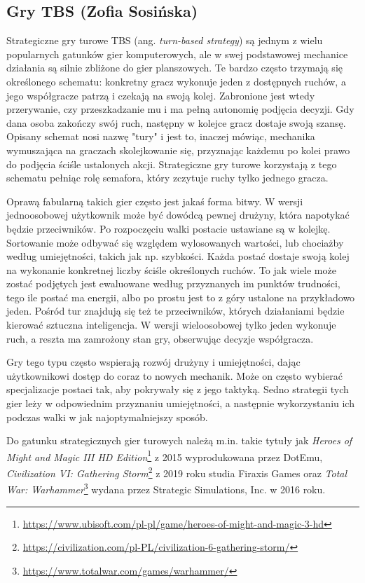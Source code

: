 \subsection{Gry TBS (Zofia Sosińska)}\label{ss:tbs}
Strategiczne gry turowe TBS (ang. \textit{turn-based strategy}) są jednym z wielu popularnych gatunków gier komputerowych, ale w swej podstawowej mechanice działania są silnie zbliżone do
gier planszowych. Te bardzo często trzymają się określonego schematu: konkretny gracz wykonuje jeden z dostępnych ruchów, a jego współgracze patrzą i czekają 
na swoją kolej. Zabronione jest wtedy przerywanie, czy przeszkadzanie mu i ma pełną autonomię podjęcia decyzji. Gdy dana osoba zakończy swój ruch, następny w kolejce gracz
dostaje swoją szansę. Opisany schemat nosi nazwę "tury" i jest to, inaczej mówiąc, mechanika wymuszająca na graczach skolejkowanie się, przyznając każdemu po kolei
prawo do podjęcia ściśle ustalonych akcji. Strategiczne gry turowe korzystają z tego schematu pełniąc rolę semafora, który zczytuje ruchy tylko jednego gracza.

Oprawą fabularną takich gier często jest jakaś forma bitwy. W wersji jednoosobowej użytkownik może być dowódcą pewnej drużyny, która napotykać będzie przeciwników. Po 
rozpoczęciu walki postacie ustawiane są w kolejkę. Sortowanie może odbywać się względem wylosowanych wartości, lub chociażby według umiejętności, takich jak np. szybkości. Każda postać
 dostaje swoją kolej na wykonanie konkretnej liczby ściśle określonych ruchów. To jak wiele może zostać podjętych jest ewaluowane według przyznanych im punktów 
 trudności, tego ile postać ma energii, albo po prostu jest to z góry ustalone na przykładowo jeden. Pośród tur znajdują się też te przeciwników, których działaniami będzie 
 kierować sztuczna inteligencja. W wersji wieloosobowej tylko jeden wykonuje ruch, a reszta ma zamrożony stan gry, obserwując decyzje współgracza.

Gry tego typu często wspierają rozwój drużyny i umiejętności, dając użytkownikowi dostęp do coraz to nowych mechanik. Może on często wybierać specjalizacje postaci tak, aby 
pokrywały się z jego taktyką. Sedno strategii tych gier leży w odpowiednim przyznaniu umiejętności, a następnie wykorzystaniu ich podczas walki w jak najoptymalniejszy sposób.

Do gatunku strategicznych gier turowych należą m.in. takie tytuły jak \textit{Heroes of Might and Magic III HD Edition}\footnote{\url{https://www.ubisoft.com/pl-pl/game/heroes-of-might-and-magic-3-hd}} z 2015 wyprodukowana przez DotEmu,
\textit{Civilization VI: Gathering Storm}\footnote{\url{https://civilization.com/pl-PL/civilization-6-gathering-storm/}} z 2019 roku studia Firaxis Games oraz \textit{Total War: Warhammer}\footnote{\url{https://www.totalwar.com/games/warhammer/}} wydana przez Strategic Simulations, Inc. w 2016 roku.
